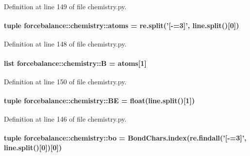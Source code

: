 \-Definition at line 149 of file chemistry.\-py.

\hypertarget{namespaceforcebalance_1_1chemistry_a769e0e6c4bad669c6786d1ff12354978}{
\paragraph[{atoms}]{\setlength{\rightskip}{0pt plus 5cm}tuple {\bf forcebalance\-::chemistry\-::atoms} = re.\-split('\mbox{[}-\/=3\mbox{]}', line.\-split()\mbox{[}0\mbox{]})}}\label{namespaceforcebalance_1_1chemistry_a769e0e6c4bad669c6786d1ff12354978}


\-Definition at line 148 of file chemistry.\-py.

\hypertarget{namespaceforcebalance_1_1chemistry_a408afe99c28b09783c769307b8819f78}{
\paragraph[{\-B}]{\setlength{\rightskip}{0pt plus 5cm}list {\bf forcebalance\-::chemistry\-::\-B} = {\bf atoms}\mbox{[}1\mbox{]}}}\label{namespaceforcebalance_1_1chemistry_a408afe99c28b09783c769307b8819f78}


\-Definition at line 150 of file chemistry.\-py.

\hypertarget{namespaceforcebalance_1_1chemistry_a2e8b0b69254f9a7346919dc00f606e74}{
\paragraph[{\-B\-E}]{\setlength{\rightskip}{0pt plus 5cm}tuple {\bf forcebalance\-::chemistry\-::\-B\-E} = float(line.\-split()\mbox{[}1\mbox{]})}}\label{namespaceforcebalance_1_1chemistry_a2e8b0b69254f9a7346919dc00f606e74}


\-Definition at line 146 of file chemistry.\-py.

\hypertarget{namespaceforcebalance_1_1chemistry_a1ef8f483a40113a668ff3743bb56d7ad}{
\paragraph[{bo}]{\setlength{\rightskip}{0pt plus 5cm}tuple {\bf forcebalance\-::chemistry\-::bo} = \-Bond\-Chars.\-index(re.\-findall('\mbox{[}-\/=3\mbox{]}', line.\-split()\mbox{[}0\mbox{]})\mbox{[}0\mbox{]})}}\label{namespaceforcebalance_1_1chemistry_a1ef8f483a40113a668ff3743bb56d7ad}


